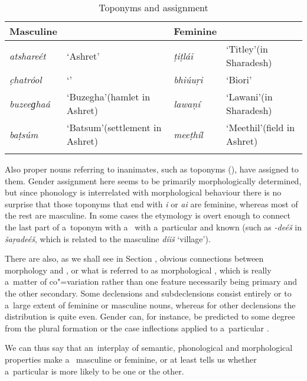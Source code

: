 \begin{table}[ht]
\caption{Toponyms and  assignment}
\begin{tabularx}{\textwidth}{ l Q l Q }
\lsptoprule
Masculine &
&
Feminine &
\\\hline
\textit{atshareét} &
`Ashret' &
\textit{ṭiṭlái} &
`Titley'\newline (in Sharadesh)\\
\textit{c̣hatróol} &
`' &
\textit{bhiúuṛi} &
`Biori'\\
\textit{buzeeɡhaá} &
`Buzegha'\newline (hamlet in Ashret) &
\textit{lawaṇí} &
`Lawani'\newline (in Sharadesh)\\
\textit{baṭsúm} &
`Batsum'\newline (settlement in Ashret) &
\textit{meeṭhíl} &
`Meethil'\newline (field in Ashret)\\\lspbottomrule
\end{tabularx}
\label{tab:4-3}
\end{table}


Also proper nouns referring to inanimates, such as toponyms (), have  assigned to them. Gender assignment here seems to be primarily morphologically determined, but since phonology is interrelated with morphological behaviour there is no surprise that those toponyms that end with \textit{i} or \textit{ai} are feminine, whereas most of the rest are masculine. In some cases the etymology is overt enough to connect the last part of a~toponym with a~ with a~particular and known  (such as \textit{-deéš} in \textit{šaṛadeéš}, which is related to the masculine  \textit{díiš} `village').


There are also, as we shall see in Section , obvious connections between  morphology and , or what is referred to as morphological  \citep[34--50]{corbett1991}, which is really a~matter of co"=variation rather than one feature necessarily being primary and the other secondary. Some declensions and subdeclensions consist entirely or to a~large extent of feminine or masculine nouns, whereas for other declensions the  distribution is quite even. Gender can, for instance, be predicted to some degree from the plural formation or the case inflections applied to a~particular .


We can thus say that an~interplay of semantic, phonological and morphological properties make a~ masculine or feminine, or at least tells us whether a~particular  is more likely to be one or the other. 


